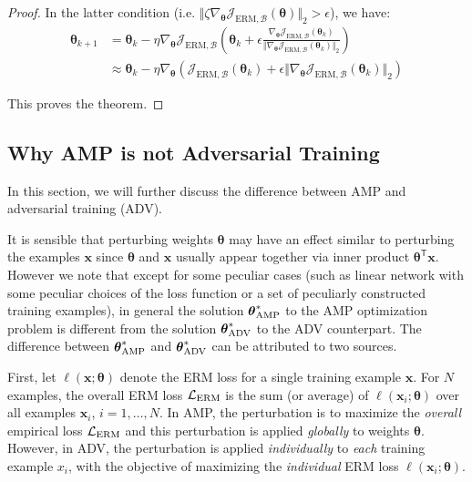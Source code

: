 \documentclass[final]{cvpr}
\begin{document}
\begin{proof}
In the latter condition (i.e. $\Vert\zeta\nabla_{\boldsymbol{\theta}}\mathcal{J}_{\mathrm{ERM},\mathcal{B}}(\boldsymbol{\theta})\Vert_2>\epsilon$), we have:
\begin{align*}
\boldsymbol{\theta}_{k+1}&=\boldsymbol{\theta}_k-\eta\nabla_{\boldsymbol{\theta}}\mathcal{J}_{\mathrm{ERM},\mathcal{B}}\left(\boldsymbol{\theta}_k+\epsilon\frac{\nabla_{\boldsymbol{\theta}}\mathcal{J}_{\mathrm{ERM},\mathcal{B}}(\boldsymbol{\theta}_k)}{\Vert\nabla_{\boldsymbol{\theta}}\mathcal{J}_{\mathrm{ERM},\mathcal{B}}(\boldsymbol{\theta}_k)\Vert_2}\right)\nonumber\\
&\approx\boldsymbol{\theta}_k-\eta\nabla_{\boldsymbol{\theta}}\left(\mathcal{J}_{\mathrm{ERM},\mathcal{B}}(\boldsymbol{\theta}_k)+\epsilon\Vert\nabla_{\boldsymbol{\theta}}\mathcal{J}_{\mathrm{ERM},\mathcal{B}}(\boldsymbol{\theta}_k)\Vert_2\right)
\end{align*}

This proves the theorem.
\end{proof}

\subsection{Why AMP is not Adversarial Training}\label{app:c}

In this section, we will further discuss the difference between AMP and adversarial training (ADV).

It is sensible that perturbing weights $\boldsymbol{\theta}$ may have an effect similar to perturbing the examples $\boldsymbol{x}$ since $\boldsymbol{\theta}$ and $\boldsymbol{x}$ usually appear together via inner product $\boldsymbol{\theta}^\mathsf{T}\boldsymbol{x}$. However we note that except for some peculiar cases (such as linear network with some peculiar choices of the loss function or a set of peculiarly constructed training examples), in general the solution $\boldsymbol{\theta}^*_{\rm AMP}$ to the AMP optimization problem is different from the solution $\boldsymbol{\theta}^*_{\rm ADV}$ to the ADV counterpart. The difference between $\boldsymbol{\theta}^*_{\rm AMP}$ and $\boldsymbol{\theta}^*_{\rm ADV}$ can be attributed to two sources. 

First, let $\ell(\boldsymbol{x};\boldsymbol{\theta})$ denote the ERM loss for a single training example $\boldsymbol{x}$. For $N$ examples, the overall ERM loss $\mathcal{L}_{\rm ERM}$ is the sum (or average) of $\ell(\boldsymbol{x}_i;\boldsymbol{\theta})$ over all examples $\boldsymbol{x}_i$, $i=1,\ldots,N$. In AMP, the perturbation is to maximize the {\em overall} empirical loss $\mathcal{L}_{\rm ERM}$ and this perturbation is applied {\em globally} to weights $\boldsymbol{\theta}$. However, in ADV, the perturbation is applied {\em individually} to {\em each} training example $x_i$, with the objective of maximizing the {\em individual} ERM loss $\ell(\boldsymbol{x}_i;\boldsymbol{\theta})$.
\end{document}
